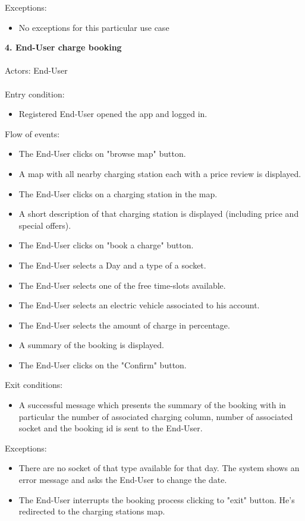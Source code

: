 \documentclass[a4paper]{report}
\begin{document}
Exceptions:
\begin{itemize}
\item No exceptions for this particular use case
\end{itemize}
\textbf{4. End-User charge booking}\label{uc:4}
\\
\\
Actors: End-User \\ \\
Entry condition:
\begin{itemize}
\item Registered End-User opened the app and logged in.
\end{itemize}
Flow of events:
\begin{itemize}
\item The End-User clicks on "browse map" button.
\item A map with all nearby charging station each with a price review is displayed.
\item The End-User clicks on a charging station in the map.
\item A short description of that charging station is displayed (including price and special offers).
\item The End-User clicks on "book a charge" button.
\item The End-User selects a Day and a type of a socket.
\item The End-User selects one of the free time-slots available.
\item The End-User selects an electric vehicle associated to his account.
\item The End-User selects the amount of charge in percentage.
\item A summary of the booking is displayed.
\item The End-User clicks on the "Confirm" button.
\end{itemize}
Exit conditions:
\begin{itemize}
\item A successful message which presents the summary of the booking with in particular the number of associated charging column, number of associated socket and the booking id is sent to the End-User.
 \end{itemize}
Exceptions:
 \begin{itemize}
 \item There are no socket of that type available for that day. The system shows an error message and asks the End-User to change the date.
 \item The End-User interrupts the booking process clicking to "exit" button. He's redirected to the charging stations map.
\end{itemize}
\end{document}

